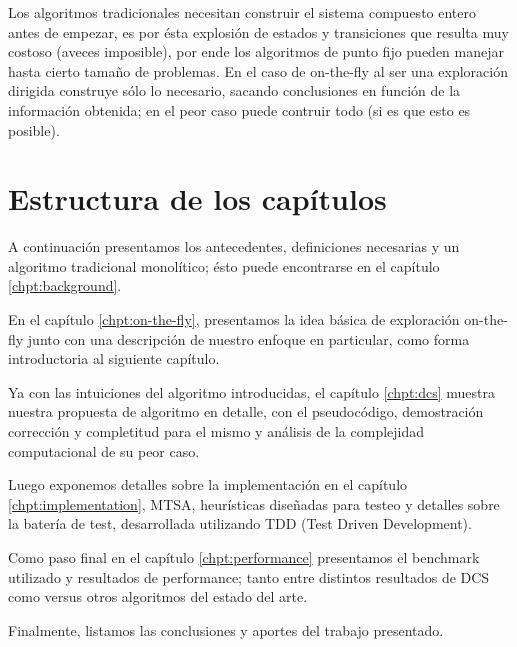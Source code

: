 Los algoritmos tradicionales necesitan construir el sistema compuesto entero antes de empezar, es por ésta explosión de estados y transiciones que resulta muy costoso (aveces imposible), por ende los algoritmos de punto fijo pueden manejar hasta cierto tamaño de problemas. En el caso de on-the-fly al ser una exploración dirigida construye sólo lo necesario, sacando conclusiones en función de la información obtenida; en el peor caso puede contruir todo (si es que esto es posible).

\section{Estructura de los capítulos}

A continuación presentamos los antecedentes, definiciones necesarias y un algoritmo tradicional monolítico; ésto puede encontrarse en el capítulo \ref{chpt:background}.

En el capítulo \ref{chpt:on-the-fly}, presentamos la idea básica de exploración on-the-fly junto con una descripción de nuestro enfoque en particular, como forma introductoria al siguiente capítulo.

Ya con las intuiciones del algoritmo introducidas, el capítulo \ref{chpt:dcs} muestra nuestra propuesta de algoritmo en detalle, con el pseudocódigo, demostración corrección y completitud para el mismo y análisis de la complejidad computacional de su peor caso.

Luego exponemos detalles sobre la implementación en el capítulo \ref{chpt:implementation}, MTSA, heurísticas diseñadas para testeo y detalles sobre la batería de test, desarrollada utilizando TDD (Test Driven Development).

Como paso final en el capítulo \ref{chpt:performance} presentamos el benchmark utilizado y resultados de performance; tanto entre distintos resultados de DCS como versus otros algoritmos del estado del arte.

Finalmente, listamos las conclusiones y aportes del trabajo presentado.









